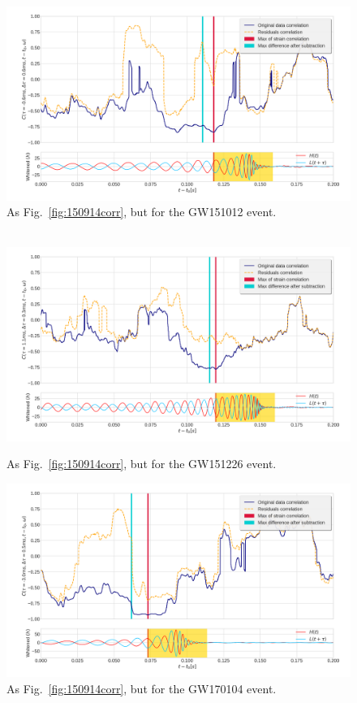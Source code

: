 \documentclass[a4paper,11pt]{article}
\begin{document}
\begin{figure}[h]
  \centering
   \includegraphics[width=\columnwidth]{GW151012CorrVsTime.png}
\caption{As Fig.~\ref{fig:150914corr}, but for the GW151012 event.}
\label{fig:151012corr}
\end{figure}
%
%
\begin{figure}[t]
  \centering
  $~$\\[1cm]
    \includegraphics[width=\columnwidth]{GW151226CorrVsTime.png}
\caption{As Fig.~\ref{fig:150914corr}, but for the  GW151226 event.}
\label{fig:151226corr}
\end{figure}

\begin{figure}[h]
  \centering
    \includegraphics[width=\columnwidth]{GW170104CorrVsTime.png}
\caption{As Fig.~\ref{fig:150914corr}, but for the GW170104 event.}
\label{fig:170104corr}
\end{figure}
\end{document}
